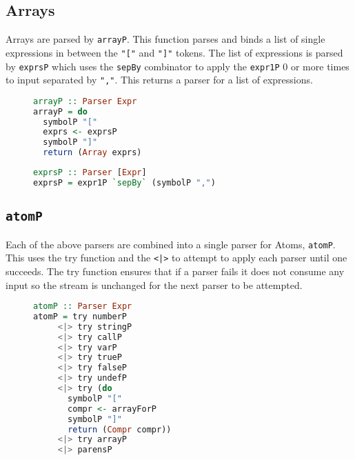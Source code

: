 \documentclass{article}
\begin{document}
\subsection{Arrays}
Arrays are parsed by \texttt{arrayP}. This function parses and binds a list of single expressions in between the \texttt{"["} and \texttt{"]"} tokens. The list of expressions is parsed by \texttt{exprsP} which uses the \texttt{sepBy} combinator to apply the \texttt{expr1P} 0 or more times to input separated by \texttt{","}. This returns a parser for a list of expressions.

\begin{figure}[h!]
\begin{minipage}{0.5\textwidth}
\centering
\begin{lstlisting}[language=Haskell]
arrayP :: Parser Expr
arrayP = do
  symbolP "["
  exprs <- exprsP
  symbolP "]"
  return (Array exprs)
\end{lstlisting}
\end{minipage}
\begin{minipage}{0.5\textwidth}
\centering
\begin{lstlisting}[language=Haskell]
exprsP :: Parser [Expr]
exprsP = expr1P `sepBy` (symbolP ",")
\end{lstlisting}
\end{minipage}
\end{figure}

\subsection{\texttt{atomP}}
Each of the above parsers are combined into a single parser for Atoms, \texttt{atomP}. This uses the try function and the \texttt{<|>} to attempt to apply each parser until one succeeds. The try function ensures that if a parser fails it does not consume any input so the stream is unchanged for the next parser to be attempted.
\begin{figure}[h!]
\begin{lstlisting}[language=Haskell]
atomP :: Parser Expr
atomP = try numberP
     <|> try stringP
     <|> try callP
     <|> try varP
     <|> try trueP
     <|> try falseP
     <|> try undefP
     <|> try (do
       symbolP "["
       compr <- arrayForP
       symbolP "]"
       return (Compr compr))
     <|> try arrayP
     <|> parensP
\end{lstlisting}
\end{figure}
\end{document}
